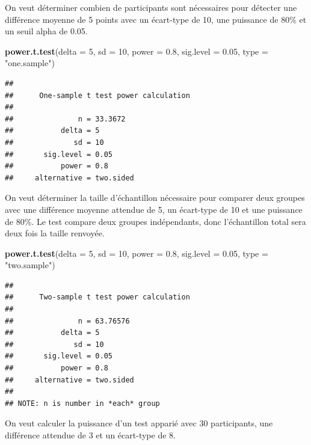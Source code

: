 \documentclass[
]{book}
\newenvironment{Shaded}{\begin{snugshade}}{\end{snugshade}}
\newcommand{\AttributeTok}[1]{\textcolor[rgb]{0.13,0.29,0.53}{#1}}
\newcommand{\DecValTok}[1]{\textcolor[rgb]{0.00,0.00,0.81}{#1}}
\newcommand{\FloatTok}[1]{\textcolor[rgb]{0.00,0.00,0.81}{#1}}
\newcommand{\FunctionTok}[1]{\textcolor[rgb]{0.13,0.29,0.53}{\textbf{#1}}}
\newcommand{\NormalTok}[1]{#1}
\newcommand{\StringTok}[1]{\textcolor[rgb]{0.31,0.60,0.02}{#1}}
\begin{document}
On veut déterminer combien de participants sont nécessaires pour détecter une différence moyenne de 5 points avec un écart-type de 10, une puissance de 80\% et un seuil alpha de 0.05.

\begin{Shaded}
\begin{Highlighting}[]
\FunctionTok{power.t.test}\NormalTok{(}\AttributeTok{delta =} \DecValTok{5}\NormalTok{, }\AttributeTok{sd =} \DecValTok{10}\NormalTok{, }\AttributeTok{power =} \FloatTok{0.8}\NormalTok{, }\AttributeTok{sig.level =} \FloatTok{0.05}\NormalTok{, }\AttributeTok{type =} \StringTok{"one.sample"}\NormalTok{)}
\end{Highlighting}
\end{Shaded}

\begin{verbatim}
## 
##      One-sample t test power calculation 
## 
##               n = 33.3672
##           delta = 5
##              sd = 10
##       sig.level = 0.05
##           power = 0.8
##     alternative = two.sided
\end{verbatim}

On veut déterminer la taille d'échantillon nécessaire pour comparer deux groupes avec une différence moyenne attendue de 5, un écart-type de 10 et une puissance de 80\%. Le test compare deux groupes indépendants, donc l'échantillon total sera deux fois la taille renvoyée.

\begin{Shaded}
\begin{Highlighting}[]
\FunctionTok{power.t.test}\NormalTok{(}\AttributeTok{delta =} \DecValTok{5}\NormalTok{, }\AttributeTok{sd =} \DecValTok{10}\NormalTok{, }\AttributeTok{power =} \FloatTok{0.8}\NormalTok{, }\AttributeTok{sig.level =} \FloatTok{0.05}\NormalTok{, }\AttributeTok{type =} \StringTok{"two.sample"}\NormalTok{)}
\end{Highlighting}
\end{Shaded}

\begin{verbatim}
## 
##      Two-sample t test power calculation 
## 
##               n = 63.76576
##           delta = 5
##              sd = 10
##       sig.level = 0.05
##           power = 0.8
##     alternative = two.sided
## 
## NOTE: n is number in *each* group
\end{verbatim}

On veut calculer la puissance d'un test apparié avec 30 participants, une différence attendue de 3 et un écart-type de 8.
\end{document}
